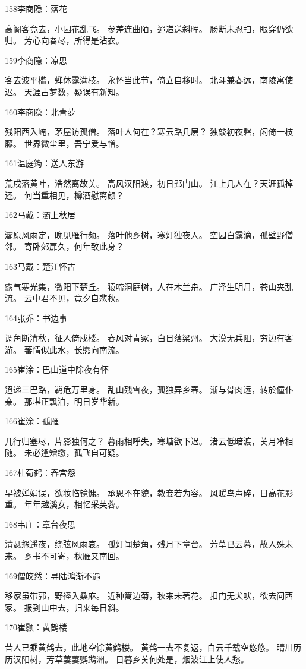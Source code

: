 158李商隐：落花

高阁客竟去，小园花乱飞。
参差连曲陌，迢递送斜晖。
肠断未忍扫，眼穿仍欲归。
芳心向春尽，所得是沾衣。

159李商隐：凉思

客去波平槛，蝉休露满枝。
永怀当此节，倚立自移时。
北斗兼春远，南陵寓使迟。
天涯占梦数，疑误有新知。

160李商隐：北青萝

残阳西入崦，茅屋访孤僧。
落叶人何在？寒云路几层？
独敲初夜磬，闲倚一枝藤。
世界微尘里，吾宁爱与憎。

161温庭筠：送人东游

荒戍落黄叶，浩然离故关。
高风汉阳渡，初日郢门山。
江上几人在？天涯孤棹还。
何当重相见，樽酒慰离颜？

162马戴：灞上秋居

灞原风雨定，晚见雁行频。
落叶他乡树，寒灯独夜人。
空园白露滴，孤壁野僧邻。
寄卧郊扉久，何年致此身？

163马戴：楚江怀古

露气寒光集，微阳下楚丘。
猿啼洞庭树，人在木兰舟。
广泽生明月，苍山夹乱流。
云中君不见，竟夕自悲秋。

164张乔：书边事

调角断清秋，征人倚戍楼。
春风对青冢，白日落梁州。
大漠无兵阻，穷边有客游。
蕃情似此水，长愿向南流。

165崔涂：巴山道中除夜有怀

迢递三巴路，羁危万里身。
乱山残雪夜，孤独异乡春。
渐与骨肉远，转於僮仆亲。
那堪正飘泊，明日岁华新。

166崔涂：孤雁

几行归塞尽，片影独何之？
暮雨相呼失，寒塘欲下迟。
渚云低暗渡，关月冷相随。
未必逢矰缴，孤飞自可疑。

167杜荀鹤：春宫怨

早被婵娟误，欲妆临镜慵。
承恩不在貌，教妾若为容。
风暖鸟声碎，日高花影重。
年年越溪女，相忆采芙蓉。

168韦庄：章台夜思

清瑟怨遥夜，绕弦风雨哀。
孤灯闻楚角，残月下章台。
芳草已云暮，故人殊未来。
乡书不可寄，秋雁又南回。

169僧皎然：寻陆鸿渐不遇

移家虽带郭，野径入桑麻。
近种篱边菊，秋来未著花。
扣门无犬吠，欲去问西家。
报到山中去，归来每日斜。

170崔颢：黄鹤楼

昔人已乘黄鹤去，此地空馀黄鹤楼。
黄鹤一去不复返，白云千载空悠悠。
晴川历历汉阳树，芳草萋萋鹦鹉洲。
日暮乡关何处是，烟波江上使人愁。

